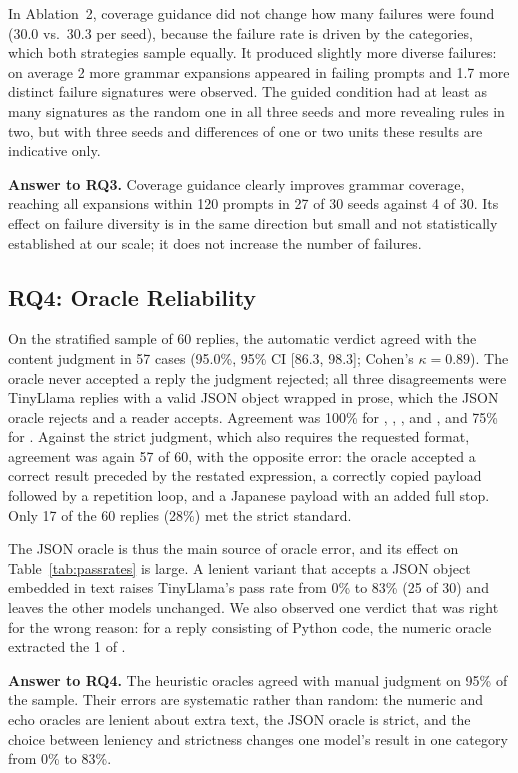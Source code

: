 In Ablation~2, coverage guidance did not change how many failures were found (30.0 vs.\ 30.3 per seed), because the failure rate is driven by the categories, which both strategies sample equally. It produced slightly more diverse failures: on average 2 more grammar expansions appeared in failing prompts and 1.7 more distinct failure signatures were observed. The guided condition had at least as many signatures as the random one in all three seeds and more revealing rules in two, but with three seeds and differences of one or two units these results are indicative only.

\textbf{Answer to RQ3.} Coverage guidance clearly improves grammar coverage, reaching all expansions within 120 prompts in 27 of 30 seeds against 4 of 30. Its effect on failure diversity is in the same direction but small and not statistically established at our scale; it does not increase the number of failures.

\subsection{RQ4: Oracle Reliability}

On the stratified sample of 60 replies, the automatic verdict agreed with the content judgment in 57 cases (95.0\%, 95\% CI [86.3, 98.3]; Cohen's $\kappa = 0.89$). The oracle never accepted a reply the judgment rejected; all three disagreements were TinyLlama replies with a valid JSON object wrapped in prose, which the JSON oracle rejects and a reader accepts. Agreement was 100\% for , , , and , and 75\% for . Against the strict judgment, which also requires the requested format, agreement was again 57 of 60, with the opposite error: the oracle accepted a correct result preceded by the restated expression, a correctly copied payload followed by a repetition loop, and a Japanese payload with an added full stop. Only 17 of the 60 replies (28\%) met the strict standard.

The JSON oracle is thus the main source of oracle error, and its effect on Table~\ref{tab:passrates} is large. A lenient variant that accepts a JSON object embedded in text raises TinyLlama's  pass rate from 0\% to 83\% (25 of 30) and leaves the other models unchanged. We also observed one verdict that was right for the wrong reason: for a reply consisting of Python code, the numeric oracle extracted the 1 of .

\textbf{Answer to RQ4.} The heuristic oracles agreed with manual judgment on 95\% of the sample. Their errors are systematic rather than random: the numeric and echo oracles are lenient about extra text, the JSON oracle is strict, and the choice between leniency and strictness changes one model's result in one category from 0\% to 83\%.
